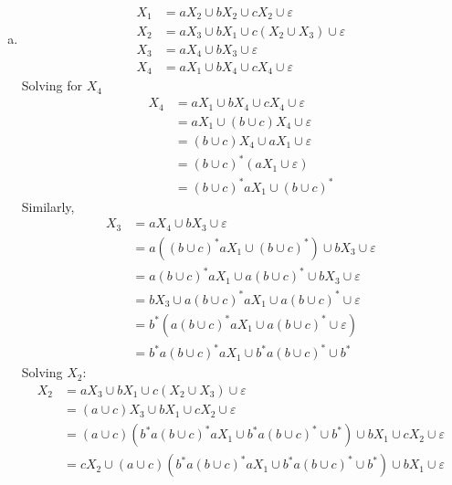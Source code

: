 \begin{solution}
    \begin{enumerate}[(a)]
        \item 
        
        \begin{align*}
            X_1 &= aX_2\cup bX_2\cup cX_2\cup\varepsilon \\
            X_2 &= aX_3\cup bX_1 \cup c(X_2\cup X_3)\cup\varepsilon \\
            X_3 &= aX_4\cup bX_3\cup\varepsilon \\
            X_4 &= aX_1\cup bX_4\cup cX_4\cup\varepsilon  
        \end{align*}
        Solving for \(X_4\) 
        \begin{align*}
            X_4 &= aX_1\cup bX_4\cup cX_4\cup\varepsilon \\
                &= aX_1\cup (b\cup c)X_4\cup\varepsilon \\
                &= (b\cup c)X_4\cup aX_1\cup\varepsilon \\
                &= {(b\cup c)}^*(aX_1\cup\varepsilon)\\
                &= {(b\cup c)}^*aX_1\cup {(b\cup c)}^*
        \end{align*}
    Similarly, 
        \begin{align*}
            X_3 &= aX_4\cup bX_3\cup\varepsilon \\
                &= a\left({(b\cup c)}^*aX_1\cup {(b\cup c)}^*\right)\cup bX_3\cup\varepsilon \\
                &= a{(b\cup c)}^*aX_1\cup a{(b\cup c)}^*\cup bX_3\cup\varepsilon \\
                &= bX_3\cup a{(b\cup c)}^*aX_1\cup a{(b\cup c)}^*\cup\varepsilon \\
                &= b^*(a{(b\cup c)}^*aX_1\cup a{(b\cup c)}^*\cup\varepsilon)\\
                &= b^*a{(b\cup c)}^*aX_1\cup b^*a{(b\cup c)}^*\cup b^*
        \end{align*}
    Solving \(X_2\):
    \begin{align*}
        X_2 &= aX_3\cup bX_1 \cup c(X_2\cup X_3)\cup\varepsilon \\
            &= (a\cup c)X_3 \cup bX_1 \cup cX_2\cup\varepsilon \\
            &= (a\cup c)(b^*a{(b\cup c)}^*aX_1\cup b^*a{(b\cup c)}^*\cup b^*)\cup bX_1 \cup cX_2\cup\varepsilon \\
            &= cX_2\cup (a\cup c)(b^*a{(b\cup c)}^*aX_1\cup b^*a{(b\cup c)}^*\cup b^*)\cup bX_1\cup\varepsilon \\

\end{align*}
\end{enumerate}
\end{solution}
